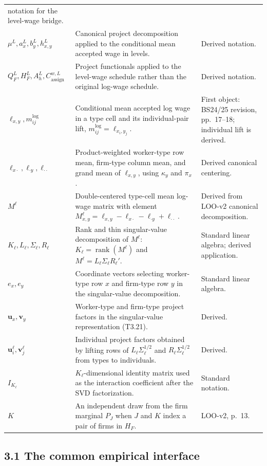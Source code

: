 \documentclass[11pt]{article}
\begin{document}
\begin{longtable}{p{}p{}p{}}
notation for the level-wage bridge. \\
\(\mu^L,a_x^L,b_y^L,h_{x,y}^L\) & Canonical project decomposition applied to
the conditional mean accepted wage in levels. & Derived notation. \\
\(Q_F^L,H_F^L,A_h^L,C_{\mathrm{assign}}^{w,L}\) & Project functionals applied
to the level-wage schedule rather than the original log-wage schedule. &
Derived notation. \\
\(\ell_{x,y},m^{\log}_{ij}\) & Conditional mean accepted log wage in a type
cell and its individual-pair lift,
\(m^{\log}_{ij}=\ell_{x_i,y_j}\). & First object: BS24/25 revision,
pp.\ 17--18; individual lift is derived. \\
\(\ell_{x\cdot},\ell_{\cdot y},\ell_{\cdot\cdot}\) & Product-weighted
worker-type row mean, firm-type column mean, and grand mean of
\(\ell_{x,y}\), using \(\kappa_y\) and \(\pi_x\). & Derived canonical
centering. \\
\(M^\ell\) & Double-centered type-cell mean log-wage matrix with element
\(M^\ell_{x,y}=\ell_{x,y}-\ell_{x\cdot}-\ell_{\cdot y}
+\ell_{\cdot\cdot}\). & Derived from LOO-v2 canonical decomposition. \\
\(K_\ell,L_\ell,\Sigma_\ell,R_\ell\) & Rank and thin singular-value
decomposition of \(M^\ell\):
\(K_\ell=\operatorname{rank}(M^\ell)\) and
\(M^\ell=L_\ell\Sigma_\ell R_\ell'\). & Standard linear algebra; derived
application. \\
\(e_x,e_y\) & Coordinate vectors selecting worker-type row \(x\) and
firm-type row \(y\) in the singular-value decomposition. & Standard linear
algebra. \\
\(\mathbf u_x,\mathbf v_y\) & Worker-type and firm-type project factors in
the singular-value representation (T3.21). & Derived. \\
\(\mathbf u_i^\ell,\mathbf v_j^\ell\) & Individual project factors obtained
by lifting rows of \(L_\ell\Sigma_\ell^{1/2}\) and
\(R_\ell\Sigma_\ell^{1/2}\) from types to individuals. & Derived. \\
\(I_{K_\ell}\) & \(K_\ell\)-dimensional identity matrix used as the
interaction coefficient after the SVD factorization. & Standard notation. \\
\(K\) & An independent draw from the firm marginal \(P_J\) when \(J\) and
\(K\) index a pair of firms in \(H_F\). & LOO-v2, p.\ 13. \\
\end{longtable}
\subsection{3.1 The common empirical interface}
\end{document}
